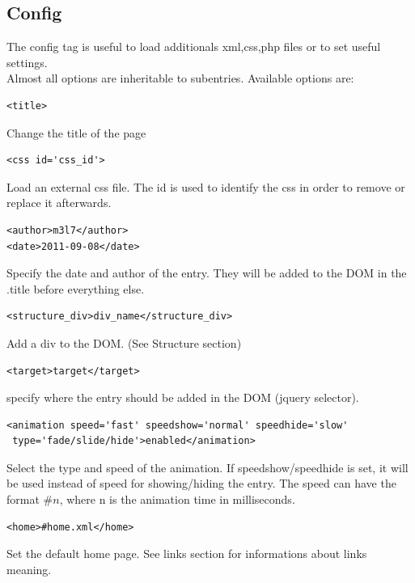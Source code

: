 \documentclass[a4paper,12pt]{article}
\begin{document}
\subsection{Config}
The config tag is useful to load additionals xml,css,php files or to set useful settings.\\
Almost all options are inheritable to subentries. Available options are:
\begin{list}{-}{}
\item \begin{verbatim}
<title>       
      \end{verbatim}
Change the title of the page
\item \begin{verbatim}
<css id='css_id'>       
      \end{verbatim}
Load an external css file. The id is used to identify the css in order to remove or replace it afterwards.
\item \begin{verbatim}
<author>m3l7</author>
<date>2011-09-08</date>
      \end{verbatim}
Specify the date and author of the entry. They will be added to the DOM in the .title before everything else.
\item \begin{verbatim}
<structure_div>div_name</structure_div>       
      \end{verbatim}
Add a div to the DOM. (See Structure section)
\item \begin{verbatim}
<target>target</target>       
      \end{verbatim}
specify where the entry should be added in the DOM (jquery selector).
\item \begin{verbatim}
<animation speed='fast' speedshow='normal' speedhide='slow'
 type='fade/slide/hide'>enabled</animation>
      \end{verbatim}
Select the type and speed of the animation. If speedshow/speedhide is set, it will be used instead of speed for showing/hiding the entry.
The speed can have the format $\#n$, where n is the animation time in milliseconds.
\item \begin{verbatim}
<home>#home.xml</home>
      \end{verbatim}
Set the default home page. See links section for informations about links meaning.
\item \begin{verbatim}

\end{verbatim}
\end{list}
\end{document}
